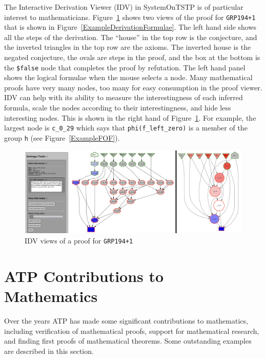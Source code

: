 \documentclass[runningheads]{llncs}
\begin{document}
The Interactive Derivation Viewer (IDV) in SystemOnTSTP is of particular interest to mathematicians.
Figure~\ref{IDV} shows two views of the proof for {\tt GRP194+1} that is shown in 
Figure~\ref{ExampleDerivationFormulae}.
The left hand side shows all the steps of the derivation.
The ``house'' in the top row is the conjecture, and the inverted triangles in the top row are the
axioms.
The inverted house is the negated conjecture, the ovals are steps in the proof, and the box at the
bottom is the {\tt \$false} node that completes the proof by refutation.
The left hand panel shows the logical formulae when the mouse selects a node.
Many mathematical proofs have very many nodes, too many for easy consumption in the proof viewer.
IDV can help with its ability to measure the interestingness of each inferred formula, scale the
nodes according to their interestingness, and hide less interesting nodes.
This is shown in the right hand of Figure~\ref{IDV}.
For example, the largest node is {\tt c\_0\_29} which says that {\tt phi(f\_left\_zero)} is a 
member of the group {\tt h} (see Figure~\ref{ExampleFOF}).

\begin{figure}[htb]
\centering
\includegraphics[width=1.0\textwidth]{IDV.pdf}
\vspace*{-1em}
\caption{IDV views of a proof for {\tt GRP194+1}}
\label{IDV}
\end{figure}

\section{ATP Contributions to Mathematics}
\label{Contributions}

Over the years ATP has made some significant contributions to mathematics, including verification
of mathematical proofs, support for mathematical research, and finding first proofs of mathematical
theorems.
Some outstanding examples are described in this section.
\end{document}
